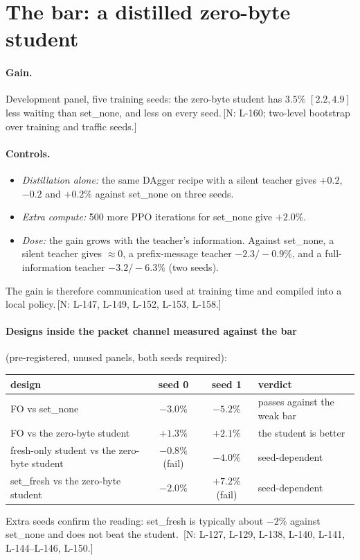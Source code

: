 \documentclass[11pt]{article}
\theoremstyle{definition}
\newif\ifshownotes\shownotestrue
\newcommand{\NOTE}[1]{\ifshownotes{\color{notecol}\,\textsf{\footnotesize[N: #1]}}\fi}
\begin{document}
\section{The bar: a distilled zero-byte student}\label{sec:student}
\paragraph{Gain.} Development panel, five training seeds: the zero-byte student has $3.5\%$ $[2.2,4.9]$ less waiting than
set\_none, and less on every seed.\NOTE{L-160; two-level bootstrap over training and traffic seeds.}
\paragraph{Controls.}
\begin{itemize}
\item \emph{Distillation alone:} the same DAgger recipe with a silent teacher gives $+0.2$, $-0.2$ and $+0.2\%$ against
set\_none on three seeds.
\item \emph{Extra compute:} 500 more PPO iterations for set\_none give $+2.0\%$.
\item \emph{Dose:} the gain grows with the teacher's information. Against set\_none, a silent teacher gives $\approx0$, a
prefix-message teacher $-2.3/-0.9\%$, and a full-information teacher $-3.2/-6.3\%$ (two seeds).
\end{itemize}
The gain is therefore communication used at training time and compiled into a local policy.\NOTE{L-147, L-149, L-152,
L-153, L-158.}
\paragraph{Designs inside the packet channel measured against the bar} (pre-registered, unused panels, both seeds
required):
\begin{center}\small
\begin{tabular}{@{}lccl@{}}
\toprule
design & seed 0 & seed 1 & verdict\\
\midrule
FO vs set\_none & $-3.0\%$ & $-5.2\%$ & passes against the weak bar\\
FO vs the zero-byte student & $+1.3\%$ & $+2.1\%$ & the student is better\\
fresh-only student vs the zero-byte student & $-0.8\%$ (fail) & $-4.0\%$ & seed-dependent\\
set\_fresh vs the zero-byte student & $-2.0\%$ & $+7.2\%$ (fail) & seed-dependent\\
\bottomrule
\end{tabular}
\end{center}
Extra seeds confirm the reading: set\_fresh is typically about $-2\%$ against set\_none and does not beat the student.
\NOTE{L-127, L-129, L-138, L-140, L-141, L-144--L-146, L-150.}
\end{document}
